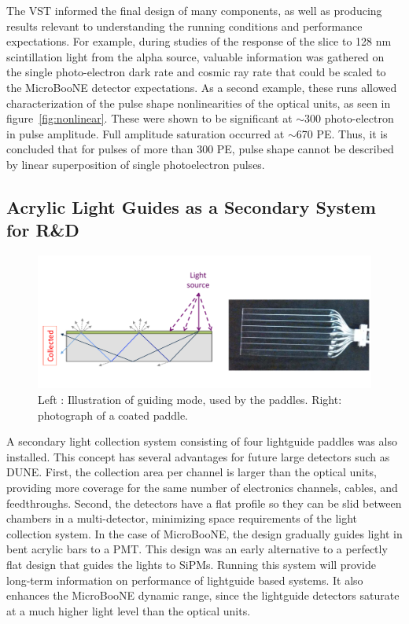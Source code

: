 The VST informed the final design of many components, as well as producing results relevant to understanding the running conditions and performance expectations.   For example, during studies of the response of the slice to 128 nm scintillation light from the alpha source, 
valuable information was gathered on the single photo-electron dark rate and cosmic ray rate that could be scaled to the MicroBooNE detector expectations.    As a second example, these runs allowed characterization of the pulse shape nonlinearities of the optical units, as seen in figure~\ref{fig:nonlinear}.  These were shown to be significant at $\sim$300 photo-electron in pulse amplitude.  Full amplitude saturation occurred at $\sim$670 PE. Thus, it is concluded that for pulses of more than 300 PE, pulse shape cannot be described by linear superposition of single photoelectron pulses. 


\subsection{Acrylic Light Guides as a Secondary System for R\&D}


\begin{figure}[t]
\centering 
\includegraphics[width=\textwidth]{./light_figures/LightguideModeAndPhoto.pdf}
\caption{Left : Illustration of guiding mode, used by the paddles. Right: photograph of a coated paddle. \label{fig:LGCoating}}
\end{figure}


A secondary light collection system consisting of four lightguide paddles was also installed.   This concept has several advantages for future large detectors such as DUNE. First, the collection area per channel is larger than the optical units, providing more coverage for the same number of electronics channels, cables, and feedthroughs.  Second, the detectors have a flat profile so they can be slid between chambers in a multi-\lartpc detector, minimizing space requirements of the light collection system.  In the case of MicroBooNE, the design gradually guides light in bent acrylic bars to a PMT.  This design was an early alternative to a perfectly flat design that guides the lights to SiPMs.  Running this system will provide long-term information on performance of lightguide based systems.  It also enhances the MicroBooNE dynamic range, since the lightguide detectors saturate at a much higher light level than the optical units.

